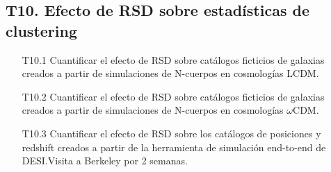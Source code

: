 \subsection*{T10. Efecto de RSD sobre estad\'isticas de clustering}
\begin{itemize}
\item[T10.1] \gradB
  Cuantificar el efecto de RSD sobre cat\'alogos ficticios de
  galaxias creados a partir de simulaciones de N-cuerpos en
  cosmolog\'ias LCDM. 
\item[T10.2] \gradB Cuantificar el efecto de RSD sobre cat\'alogos ficticios de
  galaxias creados a partir de simulaciones de N-cuerpos en
  cosmolog\'ias $\omega$CDM. 
\item[T10.3] \gradB Cuantificar el efecto de RSD sobre los cat\'alogos de
  posiciones y redshift creados a partir de la herramienta de
  simulaci\'on end-to-end de DESI.\bob Visita a Berkeley por 2 semanas.
\end{itemize}


